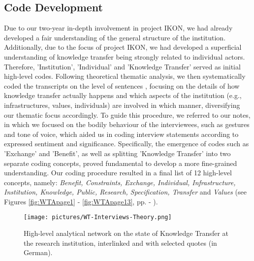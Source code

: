 \documentclass{article}
\begin{document}
\subsection{Code Development}
Due to our two-year in-depth involvement in project IKON, we had already developed a fair understanding of the general structure of the institution. Additionally, due to the focus of project IKON, we had developed a superficial understanding of knowledge transfer being strongly related to individual actors. Therefore, 'Institution', 'Individual' and 'Knowledge Transfer' served as initial high-level codes. Following theoretical thematic analysis, we then systematically coded the transcripts on the level of sentences \cite{friese_carrying_2018}, focusing on the details of how knowledge transfer actually happens and which aspects of the institution (e.g., infrastructures, values, individuals) are involved in which manner, diversifying our thematic focus accordingly. To guide this procedure, we referred to our notes, in which we focused on the bodily behaviour of the interviewees, such as gestures and tone of voice, which aided us in coding interview statements according to expressed sentiment and significance. Specifically, the emergence of codes such as 'Exchange' and 'Benefit', as well as splitting 'Knowledge Transfer' into two separate coding concepts, proved fundamental to develop a more fine-grained understanding. Our coding procedure resulted in a final list of 12 high-level concepts, namely: \textit{Benefit, Constraints, Exchange, Individual, Infrastructure, Institution, Knowledge, Public, Research, Specification, Transfer} and \textit{Values} (see Figures \ref{fig:WTApage1} - \ref{fig:WTApage13}, pp. \pageref{fig:WTApage1} - \pageref{fig:WTApage13}).

\begin{figure*}[h!]
  \centering
  \texttt{[image: pictures/WT-Interviews-Theory.png]}
  \caption{\label{fig:WTwide}%
           High-level analytical network on the state of Knowledge Transfer at the research institution, interlinked and with selected quotes (in German).}
\end{figure*}
\end{document}
